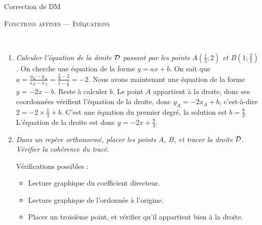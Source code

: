 \documentclass[11pt]{article}
\begin{document}
\begin{center}
  {\large
    Correction de DM

    \textsc{Fonctions affines --- Inéquations}
  }
\end{center}

\begin{exercice}~
  \begin{enumerate}[(1)]
    \item \emph{Calculer l'équation de la droite $\cal D$ passant par les points $A(\frac{1}{3}; 2)$ et $B(1; \frac{2}{3})$.}
      On cherche une équation de la forme $y=ax+b$. On sait que $a=\frac{y_B-y_A}{x_B-x_A}=\frac{\frac{2}{3}-2}{1-\frac{1}{3}}=-2$. Nous avons maintenant une équation de la forme $y=-2x-b$. Reste à calculer $b$. Le point $A$ appartient à la droite, donc ses coordonnées vérifient l'équation de la droite, donc $y_A=-2x_A+b$, c'est-à-dire $2=-2\times\frac{1}{3}+b$. C'est une équation du premier degré, la solution est $b=\frac{8}{3}$. L'équation de la droite est donc $y=-2x+\frac{8}{3}$.
    \item \emph{Dans un repère orthonormé, placer les points $A$, $B$, et tracer la droite $\cal D$. Vérifier la cohérence du tracé.}
      \begin{multicols}{2}
      \begin{center}\end{center}
      Vérifications possibles :
      \begin{itemize}
      \item Lecture graphique du coefficient directeur.
      \item Lecture graphique de l'ordonnée à l'origine.
      \item Placer un troisième point, et vérifier qu'il appartient bien à la droite.
    \end{itemize}
  \end{multicols}
  \end{enumerate}
\end{exercice}
\end{document}
